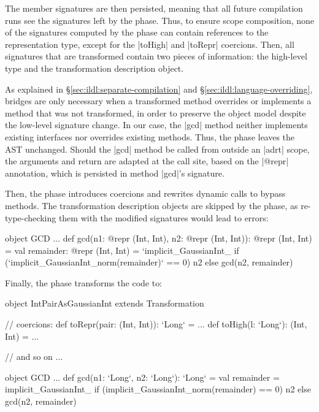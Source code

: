 The member signatures are then persisted, meaning that all future compilation runs see the signatures left by the \inject{} phase. Thus, to ensure scope composition, none of the signatures computed by the \inject{} phase can contain references to the representation type, except for the |toHigh| and |toRepr| coercions. Then, all signatures that are transformed contain two pieces of information: the high-level type and the transformation description object.

As explained in \S\ref{sec:ildl:separate-compilation} and \S\ref{sec:ildl:language-overriding}, bridges are only necessary when a transformed method overrides or implements a method that was not transformed, in order to preserve the object model despite the low-level signature change. In our case, the |gcd| method neither implements existing interfaces nor overrides existing methods. Thus, the \bridge{} phase leaves the AST unchanged. Should the |gcd| method be called from outside an |adrt| scope, the arguments and return are adapted at the call site, based on the |@repr| annotation, which is persisted in method |gcd|'s signature.

Then, the \coerce{} phase introduces coercions and rewrites dynamic calls to bypass methods. The transformation description objects are skipped by the \coerce{} phase, as re-type-checking them with the modified signatures would lead to errors:

\vspace{0.2em}
\begin{lstlisting-nobreak}
object GCD {
  ...
  def gcd(n1: @repr (Int, Int), n2: @repr (Int, Int)): @repr (Int, Int) = {
    val remainder: @repr (Int, Int) = `implicit_GaussianInt_%
    if (`implicit_GaussianInt_norm(remainder)` == 0) n2 else gcd(n2, remainder)
  }
}
\end{lstlisting-nobreak}

Finally, the \commit{} phase transforms the code to:

\vspace{0.2em}
\begin{lstlisting-nobreak}
object IntPairAsGaussianInt extends Transformation{
  // coercions:
  def toRepr(pair: (Int, Int)): `Long` = ...
  def toHigh(l: `Long`): (Int, Int) = ...

  // and so on ...
}

object GCD {
  ...
  def gcd(n1: `Long`, n2: `Long`): `Long` = {
    val remainder = implicit_GaussianInt_%
    if (implicit_GaussianInt_norm(remainder) == 0) n2 else gcd(n2, remainder)
  }
}
\end{lstlisting-nobreak}

